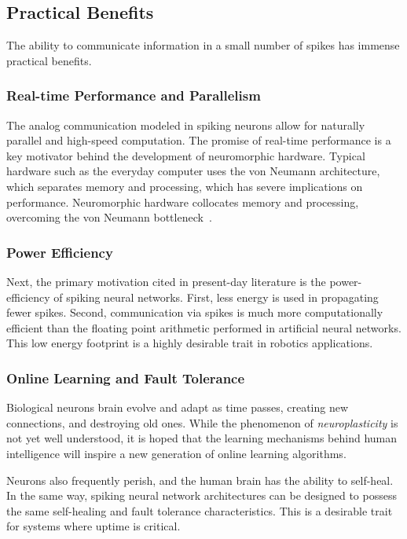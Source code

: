 \documentclass[fyp]{socreport}
\begin{document}
\subsection{Practical Benefits\label{sec:practical-benefits}}

The ability to communicate information in a small number of spikes has immense
practical benefits.

\subsubsection{Real-time Performance and Parallelism}

The analog communication modeled in spiking neurons allow for naturally parallel
and high-speed computation. The promise of real-time performance is a key
motivator behind the development of neuromorphic hardware. Typical hardware such
as the everyday computer uses the von Neumann architecture, which separates
memory and processing, which has severe implications on performance.
Neuromorphic hardware collocates memory and processing, overcoming the von
Neumann bottleneck~\cite{Backus_1978}.

\subsubsection{Power Efficiency}

Next, the primary motivation cited in present-day literature is the
power-efficiency of spiking neural networks. First, less energy is used in
propagating fewer spikes. Second, communication via spikes is much more
computationally efficient than the floating point arithmetic performed in
artificial neural networks. This low energy footprint is a highly desirable
trait in robotics applications.

\subsubsection{Online Learning and Fault Tolerance}

Biological neurons brain evolve and adapt as time passes, creating new
connections, and destroying old ones. While the phenomenon of
\emph{neuroplasticity} is not yet well understood, it is hoped that the learning
mechanisms behind human intelligence will inspire a new generation of online
learning algorithms.

Neurons also frequently perish, and the human brain has the ability to
self-heal. In the same way, spiking neural network architectures can be designed
to possess the same self-healing and fault tolerance characteristics. This is a
desirable trait for systems where uptime is critical.
\end{document}
